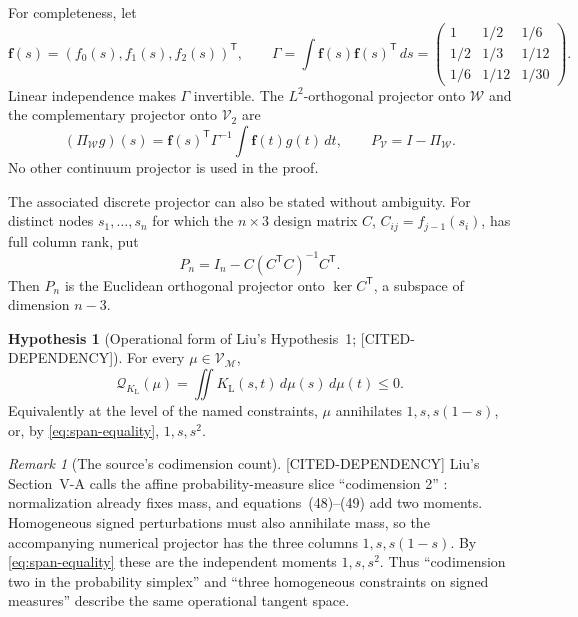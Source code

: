\documentclass[11pt]{article}
\theoremstyle{plain}
\theoremstyle{definition}
\newtheorem{hypothesis}[theorem]{Hypothesis}
\theoremstyle{remark}
\newtheorem{remark}[theorem]{Remark}
\newcommand{\M}{\mathcal M}
\newcommand{\W}{\mathcal W}
\newcommand{\V}{\mathcal V}
\newcommand{\QF}{\mathcal Q}
\newcommand{\status}[1]{\textnormal{\textsf{\footnotesize[#1]}}}
\newcommand{\CitedDependency}{\status{CITED-DEPENDENCY}}
\begin{document}
For completeness, let
\[
  \boldsymbol f(s)=(f_0(s),f_1(s),f_2(s))^{\mathsf T},
  \qquad
  \Gamma=\int\boldsymbol f(s)\boldsymbol f(s)^{\mathsf T}\,ds
  =\begin{pmatrix}
      1&1/2&1/6\\
      1/2&1/3&1/12\\
      1/6&1/12&1/30
    \end{pmatrix}.
\]
Linear independence makes \(\Gamma\) invertible.  The \(L^2\)-orthogonal
projector onto \(\W\) and the complementary projector onto \(\V_2\) are
\begin{equation}
  (\Pi_{\W}g)(s)
  =\boldsymbol f(s)^{\mathsf T}\Gamma^{-1}
      \int\boldsymbol f(t)g(t)\,dt,
  \qquad
  P_{\V}=I-\Pi_{\W}.
  \label{eq:continuum-projector}
\end{equation}
No other continuum projector is used in the proof.

The associated discrete projector can also be stated without ambiguity.  For
distinct nodes \(s_1,\ldots,s_n\) for which the \(n\times3\) design matrix
\(C\), \(C_{ij}=f_{j-1}(s_i)\), has full column rank, put
\begin{equation}
  P_n=I_n-C(C^{\mathsf T}C)^{-1}C^{\mathsf T}.
  \label{eq:discrete-projector}
\end{equation}
Then \(P_n\) is the Euclidean orthogonal projector onto
\(\ker C^{\mathsf T}\), a subspace of dimension \(n-3\).

\begin{hypothesis}[Operational form of Liu's Hypothesis~1;
\CitedDependency]
\label{hyp:liu-h1}
For every \(\mu\in\V_{\M}\),
\begin{equation}
  \QF_{K_{\mathrm L}}(\mu)
  =\iint K_{\mathrm L}(s,t)\,d\mu(s)\,d\mu(t)\le0.
  \label{eq:liu-h1}
\end{equation}
Equivalently at the level of the named constraints, \(\mu\) annihilates
\(1,s,s(1-s)\), or, by \eqref{eq:span-equality}, \(1,s,s^2\).
\end{hypothesis}

\begin{remark}[The source's codimension count]
\label{rem:codimension}
\CitedDependency{} Liu's Section~V-A calls the affine probability-measure
slice ``codimension 2'' \cite[Section~V-A]{liu}: normalization already fixes
mass, and equations~(48)--(49) add two moments.  Homogeneous signed
perturbations must also annihilate mass, so the accompanying numerical
projector has the three columns \(1,s,s(1-s)\).  By
\eqref{eq:span-equality} these are the independent moments \(1,s,s^2\).
Thus ``codimension two in the probability simplex'' and ``three homogeneous
constraints on signed measures'' describe the same operational tangent space.
\end{remark}
\end{document}

